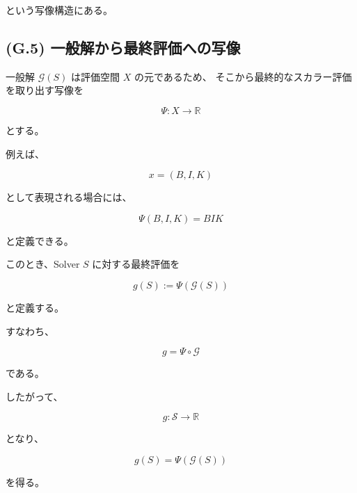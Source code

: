 \documentclass[a4paper,11pt]{article}
\begin{document}
という写像構造にある。


\subsection{(G.5) 一般解から最終評価への写像}
\label{subsec:G5}

一般解 $\mathcal{G}(S)$ は評価空間 $X$ の元であるため、
そこから最終的なスカラー評価を取り出す写像を

\begin{equation}
    \Psi:
    X
    \longrightarrow
    \mathbb{R}
\end{equation}

とする。

例えば、

\begin{equation}
    x=(B,I,K)
\end{equation}

として表現される場合には、

\begin{equation}
    \Psi(B,I,K)
    =
    BIK
\end{equation}

と定義できる。

このとき、Solver $S$ に対する最終評価を

\begin{equation}
    g(S)
    :=
    \Psi\!\left(\mathcal{G}(S)\right)
\end{equation}

と定義する。

すなわち、

\begin{equation}
    \boxed{
        g
        =
        \Psi\circ\mathcal{G}
    }
    \label{eq:G-composed-map}
\end{equation}

である。

したがって、

\begin{equation}
    g:
    \mathcal{S}
    \longrightarrow
    \mathbb{R}
\end{equation}

となり、

\begin{equation}
    \boxed{
        g(S)
        =
        \Psi\!\left(\mathcal{G}(S)\right)
    }
    \label{eq:G-scalar-evaluation}
\end{equation}

を得る。
\end{document}
